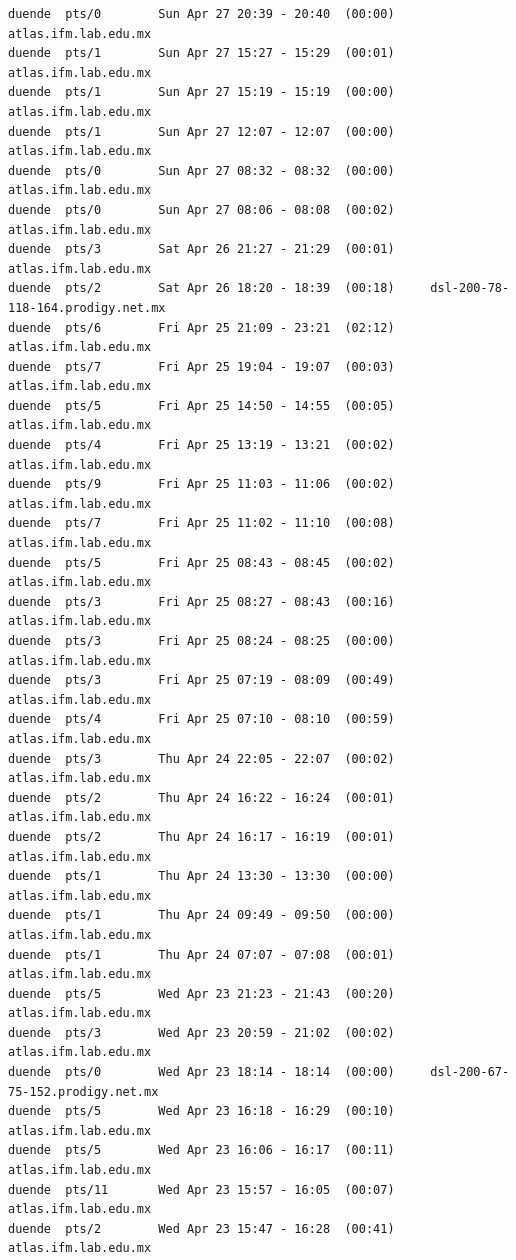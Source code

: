 \begin{lstlisting}[style=terminal]
duende  pts/0        Sun Apr 27 20:39 - 20:40  (00:00)     atlas.ifm.lab.edu.mx
duende  pts/1        Sun Apr 27 15:27 - 15:29  (00:01)     atlas.ifm.lab.edu.mx
duende  pts/1        Sun Apr 27 15:19 - 15:19  (00:00)     atlas.ifm.lab.edu.mx
duende  pts/1        Sun Apr 27 12:07 - 12:07  (00:00)     atlas.ifm.lab.edu.mx
duende  pts/0        Sun Apr 27 08:32 - 08:32  (00:00)     atlas.ifm.lab.edu.mx
duende  pts/0        Sun Apr 27 08:06 - 08:08  (00:02)     atlas.ifm.lab.edu.mx
duende  pts/3        Sat Apr 26 21:27 - 21:29  (00:01)     atlas.ifm.lab.edu.mx
duende  pts/2        Sat Apr 26 18:20 - 18:39  (00:18)     dsl-200-78-118-164.prodigy.net.mx
duende  pts/6        Fri Apr 25 21:09 - 23:21  (02:12)     atlas.ifm.lab.edu.mx
duende  pts/7        Fri Apr 25 19:04 - 19:07  (00:03)     atlas.ifm.lab.edu.mx
duende  pts/5        Fri Apr 25 14:50 - 14:55  (00:05)     atlas.ifm.lab.edu.mx
duende  pts/4        Fri Apr 25 13:19 - 13:21  (00:02)     atlas.ifm.lab.edu.mx
duende  pts/9        Fri Apr 25 11:03 - 11:06  (00:02)     atlas.ifm.lab.edu.mx
duende  pts/7        Fri Apr 25 11:02 - 11:10  (00:08)     atlas.ifm.lab.edu.mx
duende  pts/5        Fri Apr 25 08:43 - 08:45  (00:02)     atlas.ifm.lab.edu.mx
duende  pts/3        Fri Apr 25 08:27 - 08:43  (00:16)     atlas.ifm.lab.edu.mx
duende  pts/3        Fri Apr 25 08:24 - 08:25  (00:00)     atlas.ifm.lab.edu.mx
duende  pts/3        Fri Apr 25 07:19 - 08:09  (00:49)     atlas.ifm.lab.edu.mx
duende  pts/4        Fri Apr 25 07:10 - 08:10  (00:59)     atlas.ifm.lab.edu.mx
duende  pts/3        Thu Apr 24 22:05 - 22:07  (00:02)     atlas.ifm.lab.edu.mx
duende  pts/2        Thu Apr 24 16:22 - 16:24  (00:01)     atlas.ifm.lab.edu.mx
duende  pts/2        Thu Apr 24 16:17 - 16:19  (00:01)     atlas.ifm.lab.edu.mx
duende  pts/1        Thu Apr 24 13:30 - 13:30  (00:00)     atlas.ifm.lab.edu.mx
duende  pts/1        Thu Apr 24 09:49 - 09:50  (00:00)     atlas.ifm.lab.edu.mx
duende  pts/1        Thu Apr 24 07:07 - 07:08  (00:01)     atlas.ifm.lab.edu.mx
duende  pts/5        Wed Apr 23 21:23 - 21:43  (00:20)     atlas.ifm.lab.edu.mx
duende  pts/3        Wed Apr 23 20:59 - 21:02  (00:02)     atlas.ifm.lab.edu.mx
duende  pts/0        Wed Apr 23 18:14 - 18:14  (00:00)     dsl-200-67-75-152.prodigy.net.mx
duende  pts/5        Wed Apr 23 16:18 - 16:29  (00:10)     atlas.ifm.lab.edu.mx
duende  pts/5        Wed Apr 23 16:06 - 16:17  (00:11)     atlas.ifm.lab.edu.mx
duende  pts/11       Wed Apr 23 15:57 - 16:05  (00:07)     atlas.ifm.lab.edu.mx
duende  pts/2        Wed Apr 23 15:47 - 16:28  (00:41)     atlas.ifm.lab.edu.mx

\end{lstlisting}
